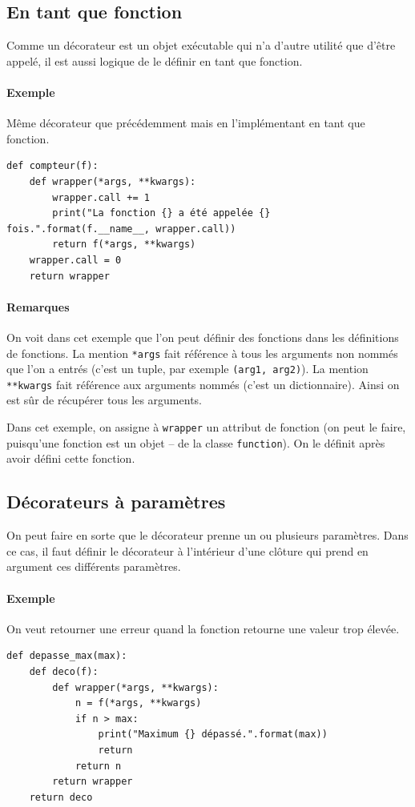 \documentclass[a4paper, 10pt]{article}
\begin{document}
\subsection{En tant que fonction}
Comme un décorateur est un objet exécutable qui n'a d'autre utilité que d'être appelé, il est aussi logique de le définir en tant que fonction.

\paragraph{Exemple} Même décorateur que précédemment mais en l'implémentant en tant que fonction.
\begin{verbatim}
def compteur(f):
    def wrapper(*args, **kwargs):
        wrapper.call += 1
        print("La fonction {} a été appelée {} fois.".format(f.__name__, wrapper.call))
        return f(*args, **kwargs)
    wrapper.call = 0
    return wrapper
\end{verbatim}
\paragraph{Remarques} On voit dans cet exemple que l'on peut définir des fonctions dans les définitions de fonctions. La mention \texttt{*args} fait référence à tous les arguments non nommés que l'on a entrés (c'est un tuple, par exemple \texttt{(arg1, arg2)}). La mention \texttt{**kwargs} fait référence aux arguments nommés (c'est un dictionnaire). Ainsi on est sûr de récupérer tous les arguments.\bigskip

Dans cet exemple, on assigne à \texttt{wrapper} un attribut de fonction (on peut le faire, puisqu'une fonction est un objet -- de la classe \texttt{function}). On le définit après avoir défini cette fonction.

\subsection{Décorateurs à paramètres}
On peut faire en sorte que le décorateur prenne un ou plusieurs paramètres. Dans ce cas, il faut définir le décorateur à l'intérieur d'une clôture qui prend en argument ces différents paramètres.

\paragraph{Exemple} On veut retourner une erreur quand la fonction retourne une valeur trop élevée.
\begin{verbatim}
def depasse_max(max):
    def deco(f):
        def wrapper(*args, **kwargs):
            n = f(*args, **kwargs)
            if n > max:
                print("Maximum {} dépassé.".format(max))
                return
            return n
        return wrapper
    return deco
\end{verbatim}
\end{document}
